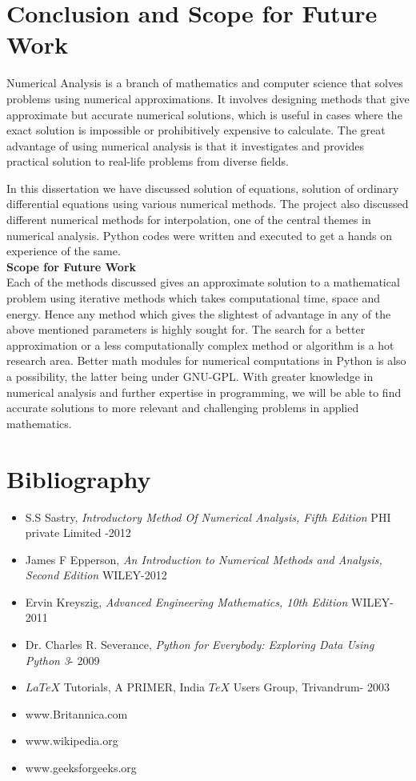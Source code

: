 \documentclass[12pt,a4paper,oneside]{book}
\begin{document}
\backmatter
\chapter{Conclusion and Scope for Future Work}
Numerical Analysis is a branch of mathematics and computer science that solves problems using numerical approximations. It involves designing methods that give approximate but accurate numerical solutions, which is useful in cases where the exact solution is impossible or prohibitively expensive to
calculate. The great advantage of using numerical analysis is that it investigates and provides practical solution to real-life problems from diverse fields. 

\noindent
In this dissertation we have discussed solution of equations, solution of ordinary differential equations using various numerical methods. The project also discussed different numerical methods for interpolation, one of the central themes in numerical analysis.  Python codes were written and executed to get a hands on experience of the same.
\\[0.5cm]
\textbf{\large Scope for Future Work}\\[0.3cm]
Each of the methods discussed gives an approximate solution to a mathematical problem using iterative methods which takes computational time, space and energy.  Hence any method which gives the slightest of advantage in any of the above mentioned parameters is highly sought for.  The search for a better approximation or a less computationally complex method or algorithm is a hot research area. Better math modules for numerical computations in Python is also a possibility, the latter being under GNU-GPL.  With greater knowledge in numerical analysis and further expertise in programming, we will be able to find accurate solutions to more relevant and challenging problems in applied mathematics.
\chapter{Bibliography}
\begin{itemize}
\item S.S Sastry, \textit{Introductory Method Of Numerical Analysis, Fifth Edition} PHI private Limited -2012
\item James F Epperson, \textit{An Introduction to Numerical Methods and Analysis, Second Edition} WILEY-2012
\item Ervin Kreyszig, \textit{Advanced Engineering Mathematics, 10th Edition} WILEY- 2011
\item Dr. Charles R. Severance, \textit{Python for Everybody: Exploring Data Using Python 3}- 2009
\item $LaTeX$ Tutorials, A PRIMER, India $TeX$ Users Group, Trivandrum- 2003
\item www.Britannica.com
\item www.wikipedia.org
\item www.geeksforgeeks.org
\end{itemize}
\end{document}
